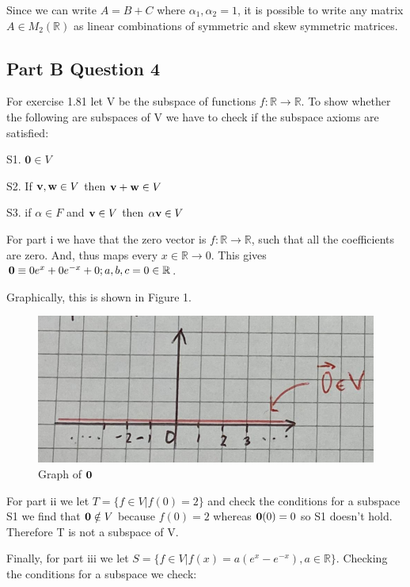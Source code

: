 \documentclass{article}
\begin{document}
Since we can write $A = B+C$ where $\alpha_1, \alpha_2 = 1$, it is possible to write any matrix $A \in M_2(\mathbb{R})$ as linear combinations of symmetric and skew symmetric matrices.


\subsection{Part B Question 4}
For exercise 1.81 let V be the subspace of functions $f: \mathbb{R} \rightarrow \mathbb{R}$. To show whether the following are subspaces of V we have to check if the subspace axioms are satisfied:

S1. $\mathbf{0} \in V$

S2. If $\bold{v}, \bold{w} \in V$ then $\bold{v} + \bold{w} \in V$

S3. if $\alpha \in F$ and $\bold {v} \in V$ then $\alpha \bold{v} \in V$

For part i we have that the zero vector is $f: \mathbb{R} \rightarrow \mathbb{R}$, such that all the coefficients are zero. And, thus maps every $x \in \mathbb{R} \rightarrow 0$. This gives $\bold{0} \equiv 0 e^x + 0e^{-x} + 0 ; a,b,c = 0 \in \mathbb{R}$. 

Graphically, this is shown in Figure 1.

\begin{figure}[ht]
    \centering
    \includegraphics[scale = 0.6]{Figure.png}
    \caption{Graph of $\bold{0}$}
    \label{fig:enter-label}
\end{figure}

For part ii we let $T = \{ f\in V | f(0) = 2 \}$ and check the conditions for a subspace S1 we find that $\bold{0} \notin V$ because $f(0) = 2$ whereas $\bold{0}(0) = 0$ so S1 doesn't hold. Therefore T is not a subspace of V.

Finally, for part iii we let $S = \{ f \in V | f(x) = a(e^x - e^{-x}), a \in \mathbb{R} \} $. Checking the conditions for a subspace we check:
\end{document}
